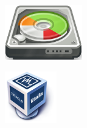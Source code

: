 \documentclass[aspectratio=43]{beamer}
\begin{document}
\begin{frame}{\subsecname}{}
\begin{multicols}{2}
\begin{itemize}
\begin{itemize}
                \end{itemize}
            \end{itemize}
        \end{multicols}
        \begin{multicols}{2}
            \begin{figure}
                \centering
                \includegraphics[width=0.3\textwidth]{img/gparted.png}
            \end{figure}
            \begin{figure}
                \centering
                \includegraphics[width=0.2\textwidth]{img/virtualbox.png}
            \end{figure}
        \end{multicols}
    \end{frame}
\end{document}
